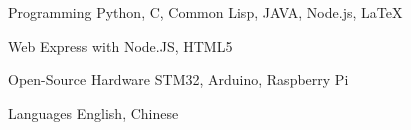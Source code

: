 


\begin{cvskills}


\cvskill
{Programming} %
{Python, C, Common Lisp, JAVA, Node.js, LaTeX} %


\cvskill
{Web} %
{Express with Node.JS, HTML5} %

\cvskill
{Open-Source Hardware}
{STM32, Arduino, Raspberry Pi}

\cvskill
{Languages} %
{English, Chinese} %


\end{cvskills}